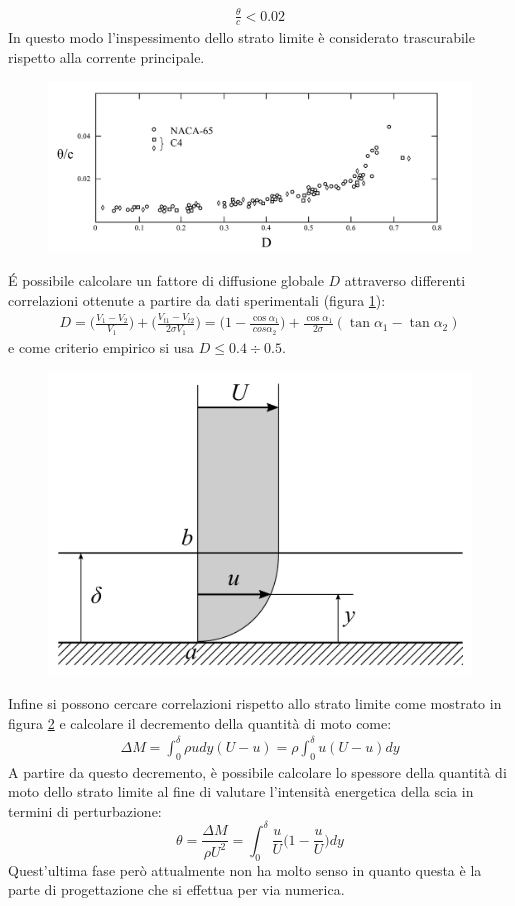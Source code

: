 \begin{align*}
\frac{\theta}{c} < 0.02
\end{align*}
In questo modo l'inspessimento dello strato limite è considerato trascurabile rispetto alla corrente principale. 
\begin{figure}[h!]
\centering
  \includegraphics[width=\textwidth]{fig/CritCarico3.pdf}
\caption{}
\label{fig:CritCarico3}
\end{figure}

\'E possibile calcolare un fattore di diffusione globale $D$ attraverso differenti correlazioni ottenute a partire da dati sperimentali (figura \ref{fig:CritCarico3}):
\begin{align*}
D = \bigg( \frac{V_1 - V_2}{V_1} \bigg) + \bigg( \frac{V_{t1} - V_{t2}}{2 \sigma V_1} \bigg) = \bigg( 1 - \frac{\cos \alpha_1}{cos \alpha_2} \bigg) + \frac{\cos \alpha_1}{2 \sigma} (\tan \alpha_1 - \tan \alpha_2)
\end{align*}
e come criterio empirico si usa $ D \leqslant 0.4 \div 0.5  $.
\begin{figure}[h!]
\centering
  \includegraphics[width=.4\textwidth]{fig/CritCarico4.pdf}
\caption{}
\label{fig:CritCarico4}
\end{figure}

Infine si possono cercare correlazioni rispetto allo strato limite come mostrato in figura \ref{fig:CritCarico4} e calcolare il decremento della quantità di moto come:
\begin{align*}
\Delta M = \int_0^{\delta} \rho u dy (U-u) = \rho \int_0^{\delta} u (U-u) dy
\end{align*} 
A partire da questo decremento, è possibile calcolare lo spessore della quantità di moto dello strato limite al fine di valutare l'intensità energetica della scia in termini di perturbazione:
\begin{equation}
\theta = \frac{\Delta M}{\rho U^2} = \int_0^{\delta} \frac{u}{U} \bigg( 1 -\frac{u}{U} \bigg) dy
\end{equation}
Quest'ultima fase però attualmente non ha molto senso in quanto questa è la parte di progettazione che si effettua per via numerica.


